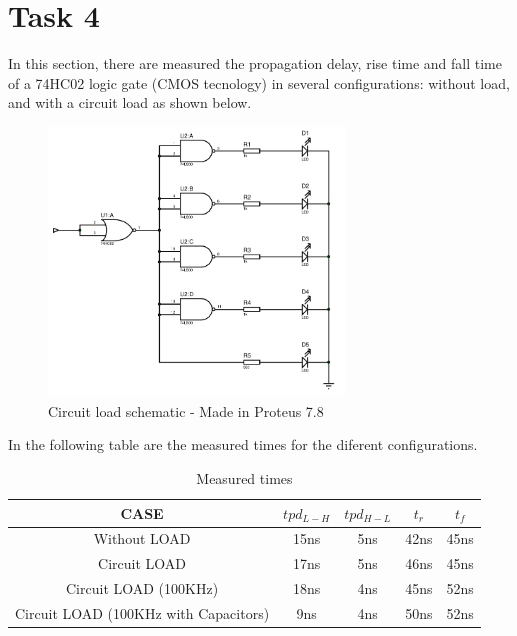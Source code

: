 \newpage

\section*{Task 4}
In this section, there are measured the 
propagation delay, rise time and fall time of
 a 74HC02 logic gate (CMOS tecnology) in 
 several configurations: without load, and with
  a circuit load as shown below.
  
\begin{figure}[H]
    \begin{centering}
    \includegraphics[width=0.7\textwidth]{data/circuitLED}
    \par\end{centering}
    \caption{Circuit load schematic - Made in Proteus 7.8}
\end{figure}

In the following table are the measured times
for the diferent configurations.

\begin{table}[H]
    \begin{center}
    \begin{tabular}{|c|c|c|c|c|}
    \hline
    CASE & $tpd_{L-H}$ & $tpd_{H-L}$ & $t_r$ & $t_f$\\
    \hline \hline
    Without LOAD & 15ns & 5ns & 42ns & 45ns \\ \hline
    Circuit LOAD & 17ns & 5ns & 46ns & 45ns \\ \hline
    Circuit LOAD (100KHz) & 18ns & 4ns & 45ns & 52ns \\ \hline
    Circuit LOAD (100KHz with Capacitors) & 9ns & 4ns & 50ns & 52ns \\ \hline
    \end{tabular}
    \caption{Measured times}
    \end{center}
\end{table}

